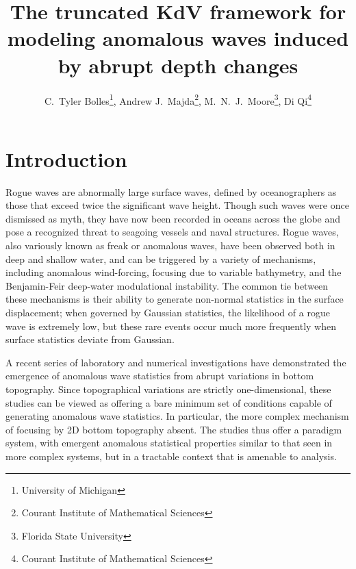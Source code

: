 \documentclass[11pt]{article}
\begin{document}
\title{The truncated KdV framework for modeling anomalous waves induced by abrupt depth changes}

\author{
C.~Tyler Bolles\thanks{University of Michigan},
Andrew J.~Majda\thanks{Courant Institute of Mathematical Sciences}, 
M.~N.~J.~Moore\thanks{Florida State University}, 
Di Qi\thanks{Courant Institute of Mathematical Sciences} }
\maketitle

\section{Introduction}

Rogue waves are abnormally large surface waves, defined by oceanographers as those that exceed twice the significant wave height. Though such waves were once dismissed as myth, they have now been recorded in oceans across the globe and pose a recognized threat to seagoing vessels and naval structures. Rogue waves, also variously known as freak or anomalous waves, have been observed both in deep and shallow water, and can be triggered by a variety of mechanisms, including anomalous wind-forcing, focusing due to variable bathymetry, and the Benjamin-Feir deep-water modulational instability. The common tie between these mechanisms is their ability to generate non-normal statistics in the surface displacement; when governed by Gaussian statistics, the likelihood of a rogue wave is extremely low, but these rare events occur much more frequently when surface statistics deviate from Gaussian. 

A recent series of laboratory \cite{bolles2019anomalous} and numerical investigations \cite{viotti2014} have demonstrated the emergence of anomalous wave statistics from abrupt variations in bottom topography. Since topographical variations are strictly one-dimensional, these studies can be viewed as offering a bare minimum set of conditions capable of generating anomalous wave statistics. In particular, the more complex mechanism of focusing by 2D bottom topography absent. The studies thus offer a paradigm system, with emergent anomalous statistical properties similar to that seen in more complex systems, but in a tractable context that is amenable to analysis.
\end{document}
